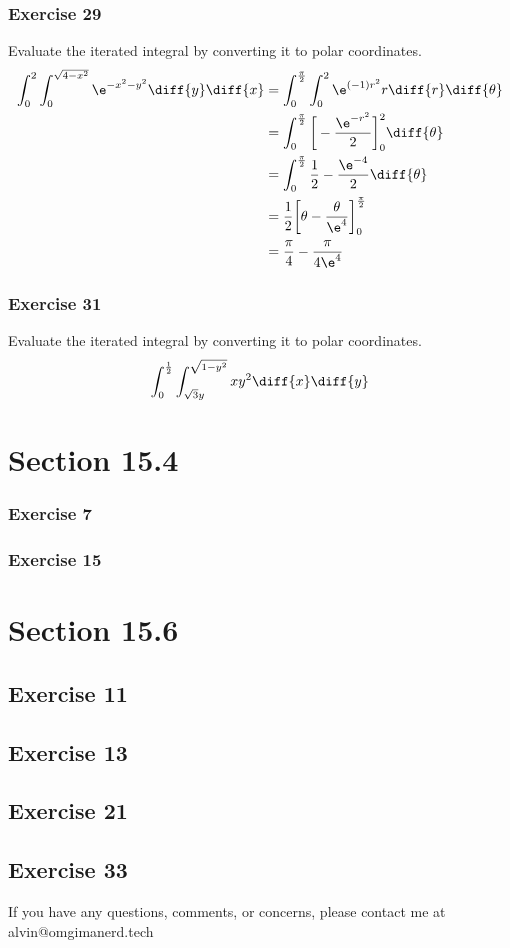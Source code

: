 \documentclass{math}
\begin{document}
\subsubsection*{Exercise 29}
Evaluate the iterated integral by converting it to polar coordinates.
\begin{align*}
  \int_{0}^{2}\int_{0}^{\sqrt{4-x^2}}\e^{-x^2-y^2}\diff{y}\diff{x} &=
    \int_{0}^{\frac{\pi}{2}}\int_{0}^{2}\e^{(-1)r^2}r\diff{r}\diff{\theta} \\
  &= \int_{0}^{\frac{\pi}{2}}
    \bigg[-\frac{\e^{-r^2}}{2}\bigg]_{0}^{2}\diff{\theta} \\
  &= \int_{0}^{\frac{\pi}{2}}\frac{1}{2}-\frac{\e^{-4}}{2}\diff{\theta} \\
  &= \frac{1}{2}\bigg[\theta-\frac{\theta}{\e^4}\bigg]_{0}^{\frac{\pi}{2}} \\
  &= \frac{\pi}{4}-\frac{\pi}{4\e^4}
\end{align*}

\subsubsection*{Exercise 31}
Evaluate the iterated integral by converting it to polar coordinates.
\begin{align*}
  \int_{0}^{\frac{1}{2}}\int_{\sqrt{3}y}^{\sqrt{1-y^2}}xy^2\diff{x}\diff{y}
\end{align*}

\section*{Section 15.4}

\subsubsection*{Exercise 7}
\subsubsection*{Exercise 15}

\section*{Section 15.6}

\subsection*{Exercise 11}
\subsection*{Exercise 13}
\subsection*{Exercise 21}
\subsection*{Exercise 33}

\begin{center}
  If you have any questions, comments, or concerns, please contact me at
  alvin@omgimanerd.tech
\end{center}
\end{document}
